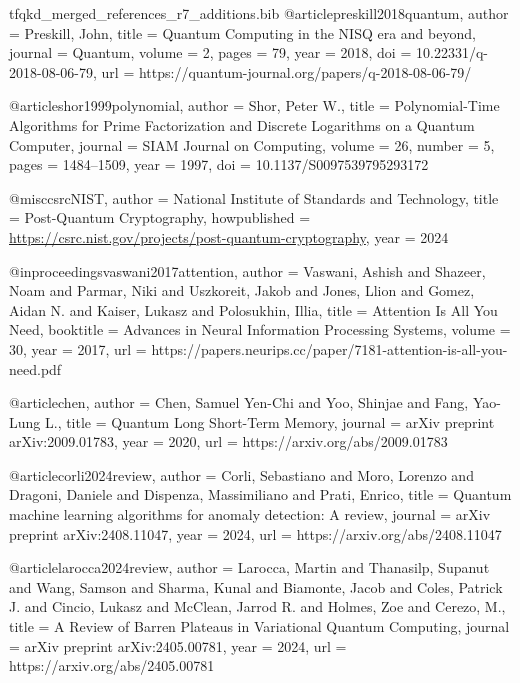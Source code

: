 
\begin{filecontents*}{tfqkd_merged_references_r7_additions.bib}
@article{preskill2018quantum,
  author  = {Preskill, John},
  title   = {Quantum Computing in the {NISQ} era and beyond},
  journal = {Quantum},
  volume  = {2},
  pages   = {79},
  year    = {2018},
  doi     = {10.22331/q-2018-08-06-79},
  url     = {https://quantum-journal.org/papers/q-2018-08-06-79/}
}

@article{shor1999polynomial,
  author  = {Shor, Peter W.},
  title   = {Polynomial-Time Algorithms for Prime Factorization and Discrete Logarithms on a Quantum Computer},
  journal = {SIAM Journal on Computing},
  volume  = {26},
  number  = {5},
  pages   = {1484--1509},
  year    = {1997},
  doi     = {10.1137/S0097539795293172}
}

@misc{csrcNIST,
  author       = {{National Institute of Standards and Technology}},
  title        = {Post-Quantum Cryptography},
  howpublished = {\url{https://csrc.nist.gov/projects/post-quantum-cryptography}},
  year         = {2024}
}

@inproceedings{vaswani2017attention,
  author    = {Vaswani, Ashish and Shazeer, Noam and Parmar, Niki and Uszkoreit, Jakob and Jones, Llion and Gomez, Aidan N. and Kaiser, Lukasz and Polosukhin, Illia},
  title     = {Attention Is All You Need},
  booktitle = {Advances in Neural Information Processing Systems},
  volume    = {30},
  year      = {2017},
  url       = {https://papers.neurips.cc/paper/7181-attention-is-all-you-need.pdf}
}

@article{chen,
  author  = {Chen, Samuel Yen-Chi and Yoo, Shinjae and Fang, Yao-Lung L.},
  title   = {Quantum Long Short-Term Memory},
  journal = {arXiv preprint arXiv:2009.01783},
  year    = {2020},
  url     = {https://arxiv.org/abs/2009.01783}
}

@article{corli2024review,
  author  = {Corli, Sebastiano and Moro, Lorenzo and Dragoni, Daniele and Dispenza, Massimiliano and Prati, Enrico},
  title   = {Quantum machine learning algorithms for anomaly detection: A review},
  journal = {arXiv preprint arXiv:2408.11047},
  year    = {2024},
  url     = {https://arxiv.org/abs/2408.11047}
}

@article{larocca2024review,
  author  = {Larocca, Martin and Thanasilp, Supanut and Wang, Samson and Sharma, Kunal and Biamonte, Jacob and Coles, Patrick J. and Cincio, Lukasz and McClean, Jarrod R. and Holmes, Zoe and Cerezo, M.},
  title   = {A Review of Barren Plateaus in Variational Quantum Computing},
  journal = {arXiv preprint arXiv:2405.00781},
  year    = {2024},
  url     = {https://arxiv.org/abs/2405.00781}
}


\end{filecontents*}
